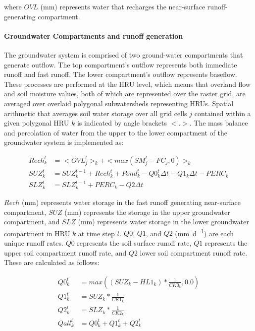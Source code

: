 \noindent where $OVL$ (\si{\milli\metre}) represents water that recharges the near-surface runoff-generating compartment.

\paragraph{Groundwater Compartments and runoff generation}
The groundwater system is comprised of two ground-water compartments that generate outflow. The top compartment's outflow represents both immediate runoff and fast runoff. The lower compartment's outflow represents baseflow. These processes are performed at the HRU level, which means that overland flow and soil moisture values, both of which are represented over the raster grid, are averaged over overlaid polygonal subwatersheds representing HRUs. Spatial arithmetic that averages soil water storage over all grid cells $j$ contained within a given polygonal HRU $k$ is indicated by angle brackets $<.>$. The mass balance and percolation of water from the upper to the lower compartment of the groundwater system is implemented as:

\begin{align}
Rech_k^t &= <OVL_j^t>_k + <max(SM_j^t - FC_j, 0)>_k\\
SUZ_k^t &= SUZ_k^{t-1} + Rech_k^t + Pond_k^t - Q0_k^t\Delta t - Q1_k\Delta t - PERC_k\\
SLZ_k^t &= SLZ_k^{t-1} + PERC_k - Q2 \Delta t
\end{align}

\noindent $Rech$ (\si{\milli\meter}) represents water storage in the fast runoff generating near-surface compartment, $SUZ$ (\si{\milli\meter}) represents the storage in the upper groundwater compartment, and $SLZ$ (\si{\milli\meter}) represents water storage in the lower groundwater compartment in HRU $k$ at time step $t$. $Q0$, $Q1$, and $Q2$ (\si{\milli\meter\per\day}) are each unique runoff rates. $Q0$ represents the soil surface runoff rate, $Q1$ represents the upper soil compartment runoff rate, and $Q2$ lower soil compartment runoff rate. These are calculated as follows:

\begin{align}
Q0_k^t &= max((SUZ_k - HL1_k) * \frac{1}{CK0_k}, 0.0)\\
Q1_k^t &= SUZ_k * \frac{1}{CK1_k}\\
Q2_k^t &= SLZ_k * \frac{1}{CK2_k}\\
Qall_k^t &= Q0_k^t + Q1_k^t + Q2_k^t
\end{align}

